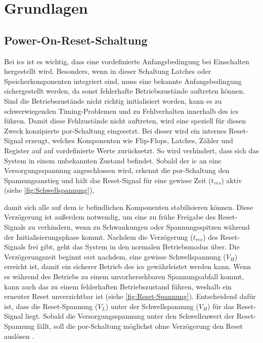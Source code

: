 \chapter{Grundlagen}\label{chap:Grundlagen}

\section{Power-On-Reset-Schaltung}
Bei \glspl{ic} ist es wichtig, dass eine vordefinierte Anfangsbedingung bei Einschalten hergestellt wird. Besonders, wenn in dieser Schaltung Latches oder Speicherkomponenten integriert sind, muss eine  bekannte Anfangsbedingung sichergestellt werden, da sonst fehlerhafte Betriebszustände auftreten können. Sind die Betriebszustände nicht richtig initialisiert worden, kann es zu schwerwiegenden Timing-Problemen und zu Fehlverhalten innerhalb des \glspl{ic} führen. Damit diese Fehlzustände nicht auftreten, wird eine speziell für diesen Zweck konzipierte \gls{por}-Schaltung eingesetzt. Bei dieser wird ein internes Reset-Signal erzeugt, welches Komponenten wie Flip-Flops, Latches, Zähler und Register auf auf vordefinierte Werte zurücksetzt. So wird verhindert, dass sich das System in einem unbekannten Zustand befindet. Sobald der \gls{ic} an eine Versorgungsspannung angeschlossen wird, erkennt die \gls{por}-Schaltung den Spannungsanstieg und hält das Reset-Signal für eine gewisse Zeit ($t_{res}$) aktiv (siehe \autoref{fig:Schwellspannung}),

damit sich alle auf dem \acrlong{ic} befindlichen Komponenten stabilisieren können. Diese Verzögerung ist außerdem notwendig, um eine zu frühe Freigabe des Reset-Signals zu verhindern, wenn zu Schwankungen oder Spannungsspitzen während der Initialisierungsphase kommt. Nachdem die Verzögerung ($t_{res}$) des Reset-Signals frei gibt, geht das System in den normalen Betriebsmodus über. Die Verzögerungszeit beginnt erst nachdem, eine gewisse Schwellspannung ($V_H$) erreicht ist, damit ein sicherer Betrieb des \glspl{ic} gewährleistet werden kann. Wenn es während des Betriebs zu einem unvorhersehbaren Spannungsabfall kommt,  kann auch das zu einem fehlerhaften Betriebszustand führen, weshalb ein erneuter Reset unverzichtbar ist  (siehe \autoref{fig:Reset-Spannung}). Entscheidend dafür ist, dass die Reset-Spannung ($V_L$) unter der Schwellspannung ($V_H$) für das Reset-Signal liegt. Sobald die Versorgungsspannung unter den Schwellenwert der Reset-Spannung fällt, soll die \gls{por}-Schaltung möglichst ohne Verzögerung den Reset auslösen \cite{9647518}. 


